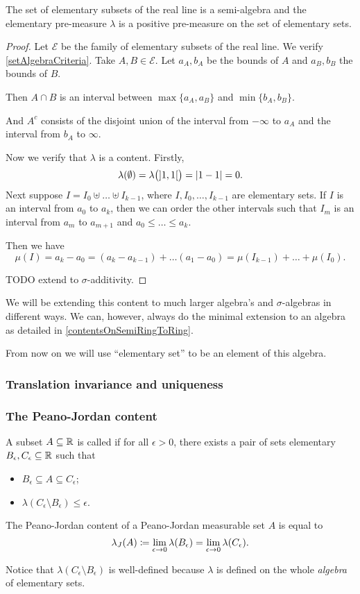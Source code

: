 \begin{lemma}
The set of elementary subsets of the real line is a semi-algebra and the elementary pre-measure $\lambda$ is a positive pre-measure on the set of elementary sets.
\end{lemma}
\begin{proof}
Let $\mathcal{E}$ be the family of elementary subsets of the real line. We verify \ref{setAlgebraCriteria}. Take $A,B\in \mathcal{E}$. Let $a_A,b_A$ be the bounds of $A$ and $a_B, b_B$ the bounds of $B$.

Then $A\cap B$ is an interval between $\max\{a_A, a_B\}$ and $\min\{b_A, b_B\}$.

And $A^c$ consists of the disjoint union of the interval from $-\infty$ to $a_A$ and the interval from $b_A$ to $\infty$.

Now we verify that $\lambda$ is a content. Firstly,
\[ \lambda(\emptyset) = \lambda\big(\interval[o]{1,1}\big) = |1-1| = 0. \]
Next suppose $I = I_0\uplus \ldots \uplus I_{k-1}$, where $I,I_0,\ldots, I_{k-1}$ are elementary sets. If $I$ is an interval from $a_0$ to $a_k$, then we can order the other intervals such that $I_m$ is an interval from $a_m$ to $a_{m+1}$ and $a_0 \leq \ldots \leq a_k$.

Then we have
\[ \mu(I) = a_k - a_0 = (a_k - a_{k-1}) + \ldots (a_1 - a_0) = \mu(I_{k-1}) + \ldots + \mu(I_0). \]


TODO extend to $\sigma$-additivity.
\end{proof}

We will be extending this content to much larger algebra's and $\sigma$-algebras in different ways. We can, however, always do the minimal extension to an algebra as detailed in \ref{contentsOnSemiRingToRing}.

From now on we will use ``elementary set'' to be an element of this algebra.

\subsubsection{Translation invariance and uniqueness}

\subsubsection{The Peano-Jordan content}
\begin{definition}
A subset $A\subseteq \mathbb{R}$ is called  if for all $\epsilon > 0$, there exists a pair of sets elementary $B_\epsilon, C_\epsilon \subseteq \mathbb{R}$ such that
\begin{itemize}
\item $B_\epsilon \subseteq A\subseteq C_\epsilon$;
\item $\lambda(C_\epsilon \setminus B_\epsilon) \leq \epsilon$.
\end{itemize}
The Peano-Jordan content of a Peano-Jordan measurable set $A$ is equal to
\[ \lambda_J(A) \coloneqq \lim_{\epsilon\to 0}\lambda(B_\epsilon) = \lim_{\epsilon\to 0}\lambda(C_\epsilon). \]
\end{definition}
Notice that $\lambda(C_\epsilon \setminus B_\epsilon)$ is well-defined because $\lambda$ is defined on the whole \emph{algebra} of elementary sets.


